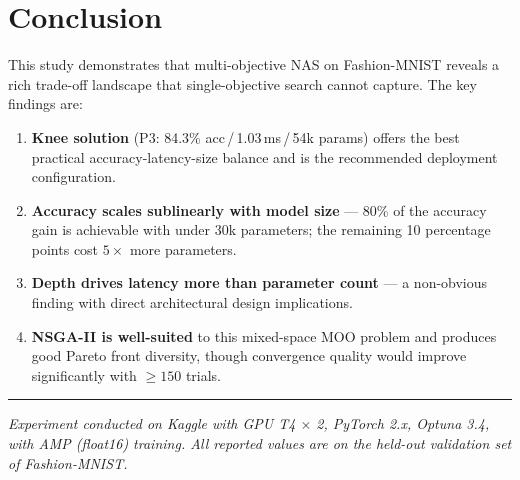 \documentclass[12pt,a4paper]{article}
\begin{document}
\section{Conclusion}

This study demonstrates that multi-objective NAS on Fashion-MNIST reveals a rich trade-off landscape that single-objective search cannot capture. The key findings are:

\begin{enumerate}
    \item \textbf{Knee solution} (P3: 84.3\% acc\,/\,1.03\,ms\,/\,54k params) offers the best practical accuracy-latency-size balance and is the recommended deployment configuration.
    \item \textbf{Accuracy scales sublinearly with model size} --- 80\% of the accuracy gain is achievable with under 30k parameters; the remaining 10 percentage points cost $5\times$ more parameters.
    \item \textbf{Depth drives latency more than parameter count} --- a non-obvious finding with direct architectural design implications.
    \item \textbf{NSGA-II is well-suited} to this mixed-space MOO problem and produces good Pareto front diversity, though convergence quality would improve significantly with $\geq 150$ trials.
\end{enumerate}

\bigskip
\hrule
\bigskip
\noindent\small\textit{Experiment conducted on Kaggle with GPU T4 $\times$ 2, PyTorch 2.x, Optuna 3.4, with AMP (float16) training. All reported values are on the held-out validation set of Fashion-MNIST.}
\end{document}
